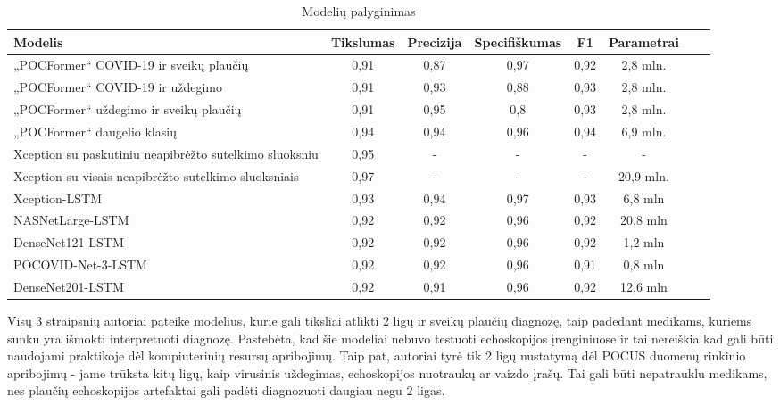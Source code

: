 \documentclass[fleqn]{VUMIFKompMagistrinis}
\begin{document}
\begin{table}[H]\footnotesize
  \centering
\caption{Modelių palyginimas}
\begin{tabular}{|p{6cm}|c|c|c|c|c|c|c|}
\hline
Modelis & Tikslumas & Precizija & Specifiškumas & F1 & Parametrai \\ \hline
„POCFormer“ COVID-19 ir sveikų plaučių  & 0,91 & 0,87 & 0,97 & 0,92 & 2,8 mln. \\
„POCFormer“ COVID-19 ir uždegimo  & 0,91 & 0,93 & 0,88 & 0,93 & 2,8 mln. \\
„POCFormer“ uždegimo ir sveikų plaučių  & 0,91 & 0,95 & 0,8 & 0,93 & 2,8 mln. \\
„POCFormer“ daugelio klasių  & 0,94 & 0,94 & 0,96 & 0,94 & 6,9 mln. \\
Xception su paskutiniu neapibrėžto sutelkimo sluoksniu  & 0,95 & - & - & - & - \\
Xception su visais neapibrėžto sutelkimo sluoksniais  & 0,97 &-  & - &  -& 20,9 mln. \\
Xception-LSTM  & 0,93 & 0,94  & 0,97 &  0,93 & 6,8 mln \\
NASNetLarge-LSTM  & 0,92 & 0,92  & 0,96 &  0,92 & 20,8 mln \\
DenseNet121-LSTM  & 0,92 & 0,92  & 0,96 &  0,92 & 1,2 mln \\
POCOVID-Net-3-LSTM  & 0,92 & 0,92  & 0,96 &  0,91 & 0,8 mln \\
DenseNet201-LSTM  & 0,92 & 0,91  & 0,96 &  0,92 & 12,6 mln \\
\hline
  \end{tabular}
  \label{tab:palyg}
\end{table}
\par
Visų 3 straipsnių autoriai pateikė modelius, kurie gali tiksliai atlikti 2 ligų ir sveikų plaučių diagnozę, taip padedant medikams, kuriems sunku yra išmokti interpretuoti diagnozę. Pastebėta, kad šie modeliai nebuvo testuoti echoskopijos įrenginiuose ir tai nereiškia kad gali būti naudojami praktikoje dėl kompiuterinių resursų apribojimų. Taip pat, autoriai tyrė tik 2 ligų nustatymą dėl POCUS duomenų rinkinio apribojimų - jame trūksta kitų ligų, kaip virusinis uždegimas, echoskopijos nuotraukų ar vaizdo įrašų. Tai gali būti nepatrauklu medikams, nes plaučių echoskopijos artefaktai gali padėti diagnozuoti daugiau negu 2 ligas.  


\printbibliography[heading=bibintoc]  %
\end{document}
